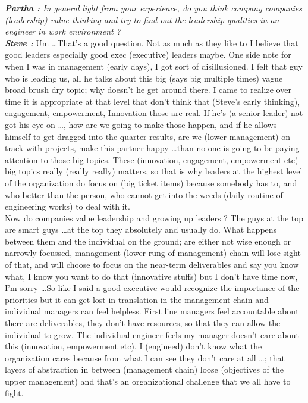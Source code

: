 \documentclass[a4paper, 12pt]{article}
\begin{document}
\begin{flushleft}
        \textit {\textbf {Partha :} In general light from your experience, do you think company companies (leadership) value thinking and try to find out the leadership qualities in an engineer in work environment ?}\\
        \textit {\textbf {Steve :}} Um \ldots That's a good question. Not as much as they like to I believe that good leaders especially good exec (executive) leaders maybe. One side note for when I was in management (early days), I got sort of disillusioned. I felt that guy who is leading us, all he talks about this big (says big multiple times) vague broad brush dry topic; why doesn't he get around there. I came to realize over time it is appropriate at that level that don't think that (Steve's early thinking), engagement, empowerment, Innovation those are real. If he's (a senior leader) not got his eye on \ldots , how are we going to make those happen, and if he allows himself to get dragged into the quarter results, are we (lower management) on track with projects, make this partner happy \ldots than no one is going to be paying attention to those big topics. These (innovation, engagement, empowerment etc)  big topics really (really really) matters, so that is why leaders at the highest level of the organization do focus on (big ticket items) because somebody has to, and who better than the person, who cannot get into the weeds (daily routine of engineering works) to deal with it. \\
        Now do companies value leadership and growing up leaders ?  The guys at the top are smart guys \ldots at the top they absolutely and usually do. What happens between them and the individual on the ground; are either not wise enough or narrowly focussed, management (lower rung of management) chain will lose sight of that, and will choose to focus on the near-term deliverables and say you know what, I know you want to do that (innovative stuffs) but I don't have time now, I'm sorry \ldots So like I said a good executive would recognize the importance of the priorities but it can get lost in translation in the management chain and individual managers can feel helpless. First line managers feel accountable about there are deliverables, they don't have resources, so that they can allow the individual to grow. The individual engineer feels my manager doesn't care about this (innovation, empowerment etc), I (engineed) don't know what the organization cares because from what I can see they don't care at all \ldots; that layers of abstraction in between (management chain) loose (objectives of the upper management) and that's an organizational challenge that we all have to fight. \\~\\


\end{flushleft}
\end{document}
